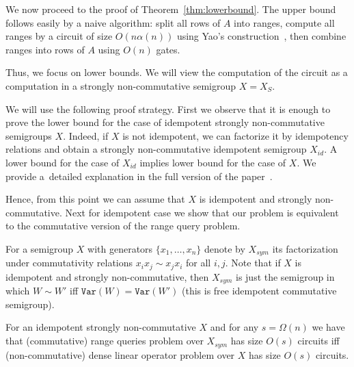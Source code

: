 \documentclass[a4paper,UKenglish,cleveref, autoref]{lipics-v2019}
\newcommand{\var}{\texttt{Var}}
\begin{document}

We now proceed to the proof of Theorem~\ref{thm:lowerbound}.
%
The upper bound follows easily by a naive algorithm: split all rows of $A$ into ranges, compute all ranges by a circuit of size $O(n\alpha(n))$ using Yao's construction~\cite{DBLP:conf/stoc/Yao82}, then combine ranges into rows of $A$ using $O(n)$ gates.

Thus, we focus on lower bounds. We will view the computation of the circuit as a computation in a strongly non-commutative semigroup $X=X_S$.

We will use the following proof strategy.
First we observe that it is enough to prove the lower bound for the case of idempotent strongly non-commutative semigroups $X$. Indeed, if $X$ is not idempotent, we can factorize it by idempotency relations and obtain a strongly non-commutative idempotent semigroup $X_{id}$. A lower bound for the case of $X_{id}$ implies lower bound for the case of $X$. %
We provide a~detailed explanation in 
the full version of the paper~\cite{DBLP:journals/eccc/KulikovMMP19}.

Hence, { from this point we can assume that $X$ is idempotent and strongly non-commutative}.
Next for idempotent case we show that our problem is equivalent to the commutative version of the range query problem.

For a semigroup $X$ with generators $\{x_1,\ldots, x_n\}$ denote by $X_{sym}$ its factorization under commutativity relations $x_i x_j \sim x_j x_i$ for all $i,j$. Note that if $X$ is idempotent and strongly non-commutative, then $X_{sym}$ is just the semigroup in which $W \sim W'$ iff $\var(W)=\var(W')$ (this is free idempotent commutative semigroup).

\begin{theorem}\label{thm:equivalence}
For an idempotent strongly non-commutative $X$ and for any $s=\Omega(n)$ we have that (commutative) range queries problem over $X_{sym}$ has size $O(s)$ circuits iff (non-commutative) dense linear operator problem over $X$ has size $O(s)$ circuits.
\end{theorem}
\end{document}
